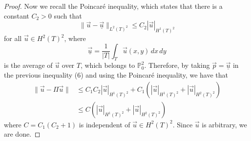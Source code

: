 \documentclass{article}
\begin{document}
\begin{proof}
	Now we recall the Poincar\'e inequality, which states that there is a constant $C_2 > 0$ such that \[\|\vec u-\underline {\vec u}\|_{L^2(T)^2} \leq C_2|\vec u|_{H^1(T)^2}\]
	for all $\vec u \in H^2(T)^2$, where \[\underline{\vec u} = \frac{1}{|T|}\int_T\vec u(x,y)\,dx\,dy\]
	is the average of $\vec u$ over $T$, which belongs to $\mathbb P_0^2$.
	Therefore, by taking $\vec p = \underline{\vec u}$ in the previous inequality (6) and using the Poincar\'e inequality, we have that
	\begin{align*}
		\|\vec u - \Pi\vec u\| & \leq C_1C_2|\vec u|_{H^1(T)^2} + C_1(|\vec u|_{H^1(T)^2} + |\vec u|_{H^2(T)^2}) \\
		                       & \leq C(|\vec u|_{H^1(T)^2} + |\vec u|_{H^2(T)^2})
	\end{align*}
	where $C = C_1(C_2 + 1)$ is independent of $\vec u \in H^2(T)^2$. Since $\vec u$ is arbitrary, we are done.
\end{proof}



\end{document}
